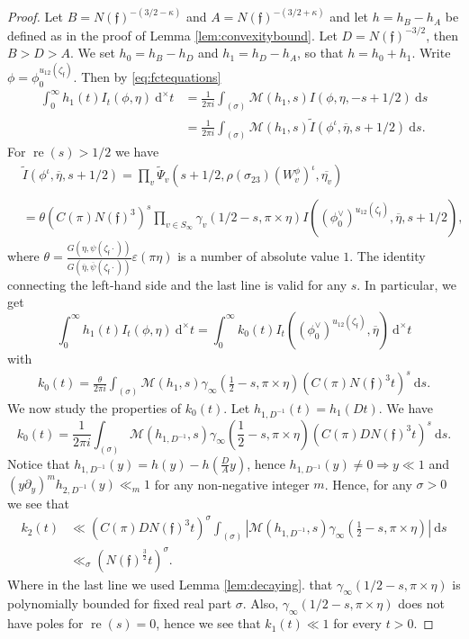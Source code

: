 \documentclass[a4paper,11pt]{amsart}
\theoremstyle{definition}
\newcommand{\real}{\operatorname{re}}
\begin{document}
\begin{proof} Let $B= N(\mathfrak{f})^{-(3/2-\kappa)}$ and $A  = N(\mathfrak{f})^{-(3/2+\kappa)}$ and let $h = h_B-h_A$ be defined as in the proof of Lemma \ref{lem:convexitybound}.
    Let $D= N(\mathfrak{f})^{-3/2}$, then $B>D>A$. We set $h_0= h_B- h_D$ and $h_1 = h_D-h_A$, so that $h = h_0+h_1$. Write $\phi = \phi_0^{u_{12}(\zeta_\mathfrak{f})}$. Then by \eqref{eq:fctequations}
    \begin{align*}\int_{0}^{\infty}h_1(t)I_t(\phi,\eta)\ \mathrm{d}^{\times}t &= \frac{1}{2\pi i}\int_{(\sigma)}\mathcal{M}(h_1,s)I(\phi,\eta,-s+1/2) \ \mathrm{d}s \\ &=\frac{1}{2\pi i}\int_{(\sigma)}\mathcal{M}(h_1,s)\tilde{I}(\phi^{\iota},\overline{\eta},s+1/2) \ \mathrm{d}s.\end{align*}
    For $\real(s)>1/2$ we have 
    \begin{align*}
        &\tilde{I}(\phi^{\iota},\overline{\eta},s+1/2)= \prod_v\tilde{\Psi}_v(s+1/2,\rho(\sigma_{23})({W}^{\phi}_v)^{\iota},\overline{\eta_v})\\
        \\&= \theta(C(\pi)N(\mathfrak{f})^3)^{s} \prod_{v\in S_{\infty}}\gamma_{v}(1/2-s,\pi\times\eta) I((\phi_0^{\vee})^{u_{12}(\zeta_\mathfrak f)},\overline{\eta},s+1/2),
    \end{align*}
    where $\theta =\frac{G(\eta,\psi(\zeta_\mathfrak{f}\cdot))}{G(\overline{\eta},\overline{\psi}(\zeta_\mathfrak{f}\cdot))}\varepsilon(\pi\eta)$ is a number of absolute value $1$. The identity connecting the left-hand side and the last line is valid for any $s$. In particular, we get 
  \[\int_0^{\infty}h_1(t)I_t(\phi,\eta)\ \mathrm{d}^{\times}t = \int_{0}^{\infty}k_0(t)I_t((\phi_0^{\vee})^{u_{12}(\zeta_\mathfrak f)},\overline{\eta})\ \mathrm{d}^{\times}t \]
  with
   \begin{align*}k_0(t)=
   \frac{\theta}{2\pi i}\int_{(\sigma)}\mathcal{M}(h_1,s)\gamma_{\infty}\left(\frac{1}{2}-s,\pi \times \eta\right)(C(\pi)N(\mathfrak{f})^3t)^s \ \mathrm{d}s.\end{align*}
  We now study the properties of $k_0(t)$. Let $h_{1,D^{-1}}(t) = h_1(Dt)$. We have \[k_0(t) = \frac{1}{2\pi i}\int_{(\sigma)}\mathcal{M}(h_{1,D^{-1}},s)\gamma_{\infty}\left(\frac{1}{2}-s,\pi \times \eta\right)(C(\pi)DN(\mathfrak{f})^3t)^{s}\ \mathrm{d}s.\]
  Notice that $h_{1,D^{-1}}(y)  = h(y)-h(\frac{D}{A}y)$, hence $h_{1,D^{-1}}(y)\neq0 \Rightarrow y\ll 1$ and  $(y\partial_y)^mh_{2,D^{-1}}(y) \ll_m 1$ for any non-negative integer $m$. Hence, for any $\sigma>0$ we see that 
  \begin{align*}k_2(t) &\ll (C(\pi)DN(\mathfrak{f})^3t)^{\sigma}\int_{(\sigma)}\left\vert{\mathcal{M}(h_{1,D^{-1}},s)\gamma_{\infty}(\frac{1}{2}-s,\pi \times \eta)}\right\vert \ \mathrm{d}s\\ &\ll_{\sigma} (N(\mathfrak{f})^{\frac{3}{2}}t)^{\sigma}.\end{align*} Where in the last line we used Lemma \ref{lem:decaying}.  that $\gamma_{\infty}(1/2-s,\pi\times\eta)$ is polynomially bounded for fixed real part $\sigma$. Also, $\gamma_{\infty}(1/2-s,\pi\times\eta)$ does not have poles for $\real(s) = 0$, hence we see that $k_1(t) \ll 1$ for every $t >0$. 
\end{proof}
\end{document}
